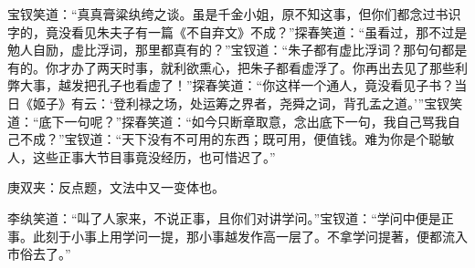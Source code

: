 \begin{parag}
    宝钗笑道：“真真膏粱纨绔之谈。虽是千金小姐，原不知这事，但你们都念过书识字的，竟没看见朱夫子有一篇《不自弃文》不成？”探春笑道：“虽看过，那不过是勉人自励，虚比浮词，那里都真有的？”宝钗道：“朱子都有虚比浮词？那句句都是有的。你才办了两天时事，就利欲熏心，把朱子都看虚浮了。你再出去见了那些利弊大事，越发把孔子也看虚了！”探春笑道：“你这样一个通人，竟没看见子书？当日《姬子》有云：‘登利禄之场，处运筹之界者，尧舜之词，背孔孟之道。’”宝钗笑道：“底下一句呢？”探春笑道：“如今只断章取意，念出底下一句，我自己骂我自己不成？”宝钗道：“天下没有不可用的东西；既可用，便值钱。难为你是个聪敏人，这些正事大节目事竟没经历，也可惜迟了。”\begin{note}庚双夹：反点题，文法中又一变体也。\end{note}李纨笑道：“叫了人家来，不说正事，且你们对讲学问。”宝钗道：“学问中便是正事。此刻于小事上用学问一提，那小事越发作高一层了。不拿学问提著，便都流入市俗去了。”
\end{parag}


